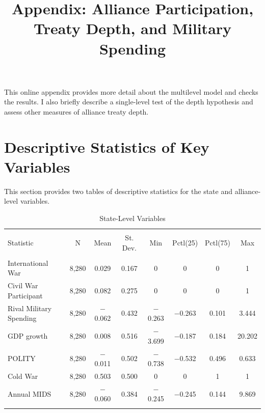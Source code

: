 \documentclass[12pt]{article}
\title{\textbf{Appendix: Alliance Participation, Treaty Depth, and Military Spending}}
\date{}
\begin{document}
\maketitle 

\singlespace 

This online appendix provides more detail about the multilevel model and checks the results. 
I also briefly describe a single-level test of the depth hypothesis and assess other measures of alliance treaty depth. 


\section{Descriptive Statistics of Key Variables} 

This section provides two tables of descriptive statistics for the state and alliance-level variables. 


\begin{table}[!htbp] \centering 
  \caption{State-Level Variables} 
  \label{tab:state-level-sum} 
\begin{tabular}{@{\extracolsep{5pt}}lccccccc} 
\\[-1.8ex]\hline 
\hline \\[-1.8ex] 
Statistic & \multicolumn{1}{c}{N} & \multicolumn{1}{c}{Mean} & \multicolumn{1}{c}{St. Dev.} & \multicolumn{1}{c}{Min} & \multicolumn{1}{c}{Pctl(25)} & \multicolumn{1}{c}{Pctl(75)} & \multicolumn{1}{c}{Max} \\ 
\hline \\[-1.8ex] 
International War & 8,280 & 0.029 & 0.167 & 0 & 0 & 0 & 1 \\ 
Civil War Participant & 8,280 & 0.082 & 0.275 & 0 & 0 & 0 & 1 \\ 
Rival Military Spending & 8,280 & $-$0.062 & 0.432 & $-$0.263 & $-$0.263 & 0.101 & 3.444 \\ 
GDP growth & 8,280 & 0.008 & 0.516 & $-$3.699 & $-$0.187 & 0.184 & 20.202 \\ 
POLITY & 8,280 & $-$0.011 & 0.502 & $-$0.738 & $-$0.532 & 0.496 & 0.633 \\ 
Cold War & 8,280 & 0.503 & 0.500 & 0 & 0 & 1 & 1 \\ 
Annual MIDS & 8,280 & $-$0.060 & 0.384 & $-$0.245 & $-$0.245 & 0.144 & 9.869 \\ 
\hline \\[-1.8ex] 
\end{tabular} 
\end{table} 
\end{document}
